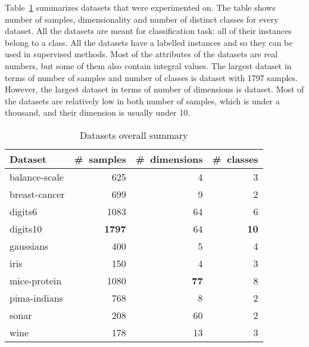\documentclass[12pt,a4paper]{report}
\begin{document}
Table~\ref{tab:datasets} summarizes datasets that were experimented on. The table shows number of samples, dimensionality and number of distinct classes for every dataset. All the datasets are meant for classification task: all of their instances belong to a class. All the datasets have a labelled instances and so they can be used in supervised methods. Most of the attributes of the datasets are real numbers, but some of them also contain integral values. The largest dataset in terms of number of samples and number of classes is  dataset with 1797 samples. However, the largest dataset in terms of number of dimensions is  dataset. Most of the datasets are relatively low in both number of samples, which is under a thousand, and their dimension is usually under 10.

\begin{table}[ht] \centering
\begin{tabular}{lrrr}
\hline
Dataset & \#~samples & \#~dimensions & \#~classes \\
\hline
balance-scale           & 625   & 4    & 3  \\
breast-cancer           & 699   & 9    & 2  \\
digits6                 & 1083  & 64   & 6  \\
digits10                & \textbf{1797}  & 64  & \textbf{10} \\
gaussians               & 400   & 5   & 4  \\
iris                    & 150   & 4    & 3  \\
mice-protein            & 1080  & \textbf{77}   & 8  \\
pima-indians            & 768   & 8    & 2  \\
sonar                   & 208   & 60   & 2  \\
wine                    & 178   & 13   & 3  \\
\hline
\end{tabular}
\caption{Datasets overall summary} \label{tab:datasets}
\end{table}
\end{document}
